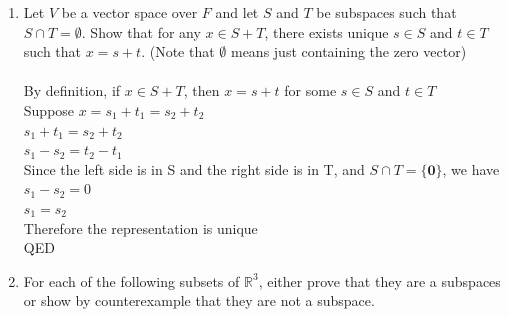 \documentclass{article}
\begin{document}
{{\begin{enumerate}
\newpage\item Let $V$ be a vector space over $F$ and let $S$ and $T$ be subspaces such that $S\cap T=\emptyset$. Show that for any $x\in S+T$, there exists unique $s\in S$ and $t\in T$ such that $x=s+t$. (Note that $\emptyset$ means just containing the zero vector)
\\
\\By definition, if $x\in S+T$, then $x=s+t$ for some $s\in S$ and $t\in T$
\\Suppose $x=s_1+t_1=s_2+t_2$
\\$s_1+t_1=s_2+t_2$
\\$s_1-s_2=t_2-t_1$
\\Since the left side is in S and the right side is in T, and $S\cap T= \{\bm 0\}$, 
we have $s_1-s_2=0$
\\$s_1=s_2$
\\Therefore the representation is unique
\\QED

\newpage\item For each of the following subsets of $\mathbb{R}^3$, either prove that they are a subspaces or show by counterexample that they are not a subspace.


\end{enumerate}}}
\end{document}
